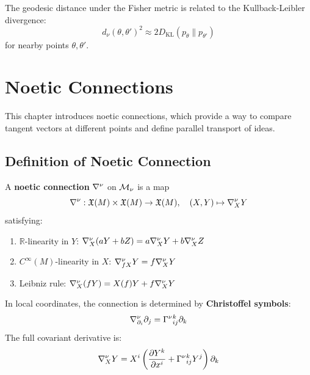 \begin{example}
\label{ex:kl-distance}
The geodesic distance under the Fisher metric is related to the
Kullback-Leibler divergence:
\[
    d_\nu(\theta, \theta')^2 \approx 2 D_{\mathrm{KL}}(p_\theta \| p_{\theta'})
\]
for nearby points $\theta, \theta'$.
\end{example}


\chapter{Noetic Connections}
\label{ch:noetic-connections}

\begin{tcolorbox}[colback=blue!5!white,colframe=blue!75!black,title=\vnewfour]
This chapter introduces noetic connections, which provide a way to compare
tangent vectors at different points and define parallel transport of ideas.
\end{tcolorbox}

\section{Definition of Noetic Connection}

\begin{definition}
\label{def:noetic-connection}
A \textbf{noetic connection} $\nabla^\nu$ on $\mathcal{M}_\nu$ is a map
\[
    \nabla^\nu : \mathfrak{X}(M) \times \mathfrak{X}(M) \to \mathfrak{X}(M),
    \quad (X, Y) \mapsto \nabla^\nu_X Y
\]
satisfying:
\begin{enumerate}[label=(\alph*)]
    \item $\mathbb{R}$-linearity in $Y$: $\nabla^\nu_X(aY + bZ) = a\nabla^\nu_X Y + b\nabla^\nu_X Z$
    \item $C^\infty(M)$-linearity in $X$: $\nabla^\nu_{fX} Y = f\nabla^\nu_X Y$
    \item Leibniz rule: $\nabla^\nu_X(fY) = X(f)Y + f\nabla^\nu_X Y$
\end{enumerate}
\end{definition}

\begin{definition}
\label{def:christoffel}
In local coordinates, the connection is determined by \textbf{Christoffel symbols}:
\[
    \nabla^\nu_{\partial_i} \partial_j = \Gamma^\nu{}^k_{ij} \partial_k
\]
The full covariant derivative is:
\[
    \nabla^\nu_X Y = X^i \left(\frac{\partial Y^k}{\partial x^i}
    + \Gamma^\nu{}^k_{ij} Y^j\right) \partial_k
\]
\end{definition}

